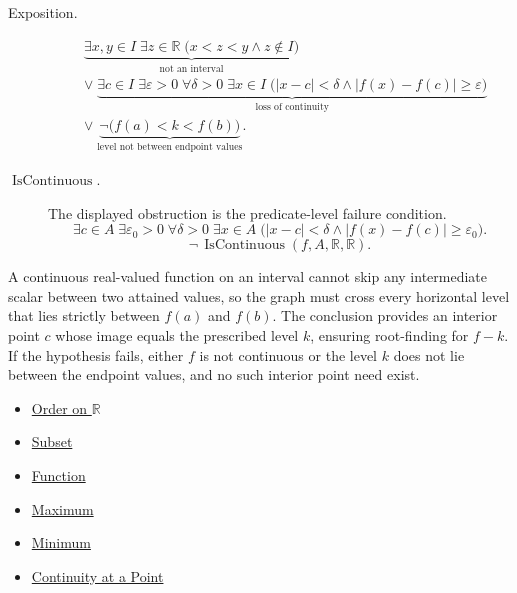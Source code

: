 \begin{remark*}
\begin{description}
  \item[Exposition.]
\[
\begin{aligned}
&\underbrace{\exists x,y\in I\;\exists z\in\mathbb{R}\;
\bigl(x<z<y\land z\notin I\bigr)}_{\text{not an interval}}\\
&\lor\;
\underbrace{\exists c\in I\;\exists \varepsilon>0\;\forall \delta>0\;\exists x\in I\;
\bigl(|x-c|<\delta\land |f(x)-f(c)|\ge\varepsilon\bigr)}_{\text{loss of continuity}}\\
&\lor\;
\underbrace{\neg\bigl(f(a)<k<f(b)\bigr)}_{\text{level not between endpoint values}}.
\end{aligned}
\]


  \item[\(\operatorname{IsContinuous}.\)]
  The displayed obstruction is the predicate-level failure condition.
  \[
  \exists c\in A\;\exists\varepsilon_0>0\;\forall\delta>0\;\exists x\in A\;
  \bigl(|x-c|<\delta\land |f(x)-f(c)|\ge\varepsilon_0\bigr).
  \]
  \[
  \neg\,\operatorname{IsContinuous}(f,A,\mathbb{R},\mathbb{R}).
  \]
\end{description}
\end{remark*}

\begin{remark*}[Interpretation]
A continuous real-valued function on an interval cannot skip any intermediate scalar between two attained values, so the graph must cross every horizontal level that lies strictly between $f(a)$ and $f(b)$. The conclusion provides an interior point $c$ whose image equals the prescribed level $k$, ensuring root-finding for $f-k$. If the hypothesis fails, either $f$ is not continuous or the level $k$ does not lie between the endpoint values, and no such interior point need exist.
\end{remark*}

\begin{dependencies}
\begin{itemize}
  \item \hyperref[def:order-on-r]{Order on $\mathbb{R}$}
  \item \hyperref[def:subset]{Subset}
  \item \hyperref[def:function]{Function}
  \item \hyperref[def:maximum]{Maximum}
  \item \hyperref[def:minimum]{Minimum}
  \item \hyperref[def:continuous-at-point]{Continuity at a Point}
\end{itemize}
\end{dependencies}

